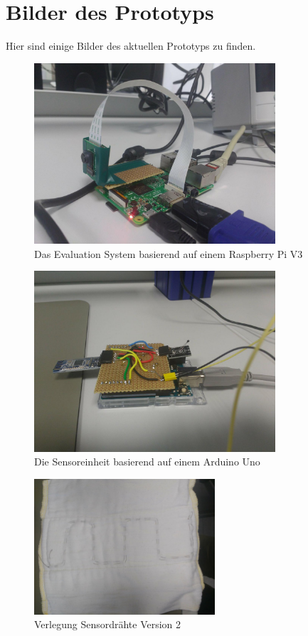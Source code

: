 \section{Bilder des Prototyps}
Hier sind einige Bilder des aktuellen Prototyps zu finden. 

\begin{figure}[ht!]
  \centering
  \includegraphics[width=0.8\textwidth]{includes/bilder/raspi_eval-sys}
  \caption{Das Evaluation System basierend auf einem Raspberry Pi V3}
  \label{fig:a_eval-sys}
\end{figure}

\begin{figure}[ht!]
  \centering
  \includegraphics[width=0.8\textwidth]{includes/bilder/sensoreinheit_ble_module}
  \caption{Die Sensoreinheit basierend auf einem Arduino Uno}
  \label{fig:a_sensor}
\end{figure}

\begin{figure}[ht!]
  \centering
  \includegraphics[width=0.6\textwidth]{includes/bilder/windel_cap_sensor_2}
  \caption{Verlegung Sensordrähte Version 2}
  \label{fig:a_windel_cap_2}
\end{figure}

